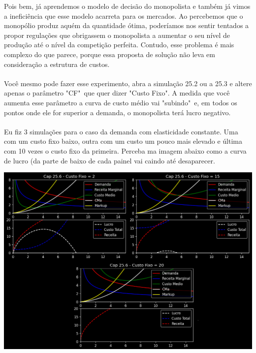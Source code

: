 \documentclass[a4paper,11pt,oneside]{book}
\theoremstyle{definition}
\theoremstyle{break}
\begin{document}
Pois bem, já aprendemos o modelo de decisão do monopolista e também já vimos a ineficiência que esse modelo acarreta para os mercados. Ao percebemos que o monopólio produz aquém da quantidade ótima, poderíamos nos sentir tentados a propor regulações que obrigassem o monopolista a aumentar o seu nível de produção até o nível da competição perfeita. Contudo, esse problema é mais complexo do que parece, porque essa proposta de solução não leva em consideração a estrutura de custos.
\\~\\
Você mesmo pode fazer esse experimento, abra a simulação 25.2 ou a 25.3 e altere apenas o parâmetro "CF"\ que quer dizer "Custo Fixo". A medida que você aumenta esse parâmetro a curva de custo médio vai "subindo"\ e, em todos os pontos onde ele for superior a demanda, o monopolista terá lucro negativo.
\\~\\
Eu fiz 3 simulações para o caso da demanda com elasticidade constante. Uma com um custo fixo baixo, outra com um custo um pouco mais elevado e última com 10 vezes o custo fixo da primeira. Perceba ma imagem abaixo como a curva de lucro (da parte de baixo de cada painel vai caindo até desaparecer.

\begin{center}
\includegraphics[scale=0.38]{cap25_6-monopolio_natural.png}
\end{center}
\end{document}
